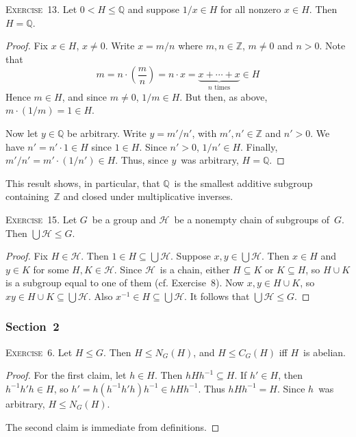 \documentclass[letterpaper]{article}
\newcommand{\exercise}[1]{\goodbreak\noindent\textsc{Exercise~{#1}.}}
\newcommand{\Z}{\mathbb{Z}}
\newcommand{\Q}{\mathbb{Q}}
\renewcommand{\H}{\mathcal{H}}
\newcommand{\union}{\cup}
\newcommand{\bigunion}{\bigcup}
\newcommand{\subgroup}{\le}
\begin{document}
\exercise{13}
Let $0<H\subgroup\Q$ and suppose $1/x\in H$ for all nonzero $x\in H$. Then $H=\Q$.
\begin{proof}
Fix $x\in H$, $x\ne0$. Write $x=m/n$ where $m,n\in\Z$, $m\ne0$ and $n>0$. Note that
$$m=n\cdot\left(\frac{m}{n}\right)=n\cdot x=\underbrace{x+\cdots+x}_{n\text{ times}}\in H$$
Hence $m\in H$, and since $m\ne0$, $1/m\in H$. But then, as above, $m\cdot(1/m)=1\in H$.

Now let $y\in\Q$ be arbitrary. Write $y=m'/n'$, with $m',n'\in\Z$ and $n'>0$. We have $n'=n'\cdot 1\in H$ since $1\in H$. Since $n'>0$, $1/n'\in H$. Finally, $m'/n'=m'\cdot(1/n')\in H$. Thus, since $y$~was arbitrary, $H=\Q$.
\end{proof}
\noindent This result shows, in particular, that $\Q$~is the smallest additive subgroup containing~$\Z$ and closed under multiplicative inverses.

\bigskip
\exercise{15}
Let $G$~be a group and $\H$~be a nonempty chain of subgroups of~$G$. Then $\bigunion\H\subgroup G$.
\begin{proof}
Fix $H\in\H$. Then $1\in H\subseteq\bigunion\H$. Suppose $x,y\in\bigunion\H$. Then $x\in H$ and $y\in K$ for some $H,K\in\H$. Since $\H$~is a chain, either $H\subseteq K$ or $K\subseteq H$, so $H\union K$ is a subgroup equal to one of them (cf. Exercise~8). Now $x,y\in H\union K$, so $xy\in H\union K\subseteq\bigunion\H$. Also $x^{-1}\in H\subseteq\bigunion\H$. It follows that $\bigunion\H\subgroup G$.
\end{proof}

\subsubsection*{Section~2}
\exercise{6}
Let $H\subgroup G$. Then $H\subgroup N_G(H)$, and $H\subgroup C_G(H)$ iff $H$~is abelian.
\begin{proof}
For the first claim, let $h\in H$. Then $hHh^{-1}\subseteq H$. If $h'\in H$, then $h^{-1}h'h\in H$, so $h'=h(h^{-1}h'h)h^{-1}\in hHh^{-1}$. Thus $hHh^{-1}=H$. Since $h$~was arbitrary, $H\subgroup N_G(H)$.

The second claim is immediate from definitions.
\end{proof}
\end{document}
